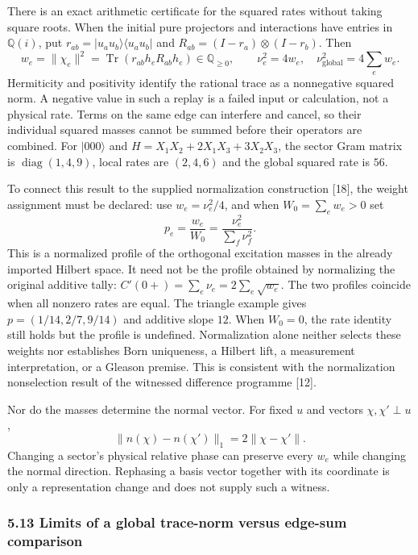 \documentclass[
  11pt,
]{article}
\begin{document}
There is an exact arithmetic certificate for the squared rates without taking
square roots. When the initial pure projectors and interactions have entries
in \(\mathbb Q(i)\), put \(r_{ab}=|u_au_b\rangle\langle u_au_b|\) and
\(R_{ab}=(I-r_a)\otimes(I-r_b)\). Then
\[
w_e=\lVert \chi_e\rVert^2=\operatorname{Tr}(r_{ab}h_eR_{ab}h_e)\in\mathbb Q_{\ge0},
\qquad \nu_e^2=4w_e,\quad \nu_{\mathrm{global}}^2=4\sum_ew_e.
\]
Hermiticity and positivity identify the rational trace as a nonnegative squared
norm. A negative value in such a replay is a failed input or calculation, not
a physical rate. Terms on the same edge can interfere and cancel, so their
individual squared masses cannot be summed before their operators are combined.
For \(|000\rangle\) and
\(H=X_1X_2+2X_1X_3+3X_2X_3\), the sector Gram matrix is
\(\operatorname{diag}(1,4,9)\), local rates are \((2,4,6)\) and the global squared
rate is \(56\).

To connect this result to the supplied normalization construction {[}18{]}, the
weight assignment must be declared: use \(w_e=\nu_e^2/4\), and when
\(W_0=\sum_ew_e>0\) set
\[
p_e=\frac{w_e}{W_0}=\frac{\nu_e^2}{\sum_f\nu_f^2}.
\]
This is a normalized profile of the orthogonal excitation masses in the
already imported Hilbert space. It need not be the profile obtained by normalizing
the original additive tally: \(C'(0+)=\sum_e\nu_e=2\sum_e\sqrt{w_e}\).
The two profiles coincide when all nonzero rates are equal.
The triangle example gives \(p=(1/14,2/7,9/14)\) and additive slope \(12\).
When \(W_0=0\), the rate identity still holds but the profile is undefined.
Normalization alone neither selects these weights nor establishes Born uniqueness,
a Hilbert lift, a measurement interpretation, or a Gleason premise. This is
consistent with the normalization nonselection result of the witnessed
difference programme {[}12{]}.

Nor do the masses determine the normal vector. For fixed \(u\) and vectors
\(\chi,\chi'\perp u\),
\[
\lVert n(\chi)-n(\chi')\rVert_1=2\lVert \chi-\chi'\rVert.
\]
Changing a sector's physical relative phase can preserve every \(w_e\) while
changing the normal direction. Rephasing a basis vector together with its
coordinate is only a representation change and does not supply such a witness.

\subsubsection{5.13 Limits of a global trace-norm versus edge-sum comparison}\label{limits-of-a-global-trace-norm-versus-edge-sum-comparison}
\end{document}
